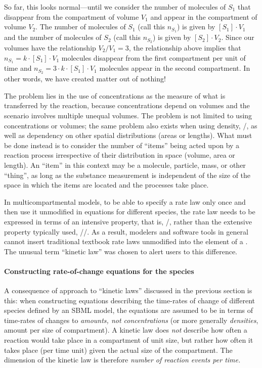 So far, this looks normal---until we consider the number of
molecules of $S_1$ that disappear from the compartment of volume
$V_1$ and appear in the compartment of volume $V_2$.  The number
of molecules of $S_1$ (call this $n_{S_1}$) is given by $[S_1]
\cdot V_1$ and the number of molecules of $S_2$ (call this
$n_{S_2}$) is given by $[S_2] \cdot V_2$.  Since our volumes have
the relationship $V_2 / V_1 = 3$, the relationship above implies
that $n_{S_1} = k \cdot [S_1] \cdot V_1$ molecules disappear from
the first compartment per unit of time and $n_{S_2} = 3
\cdot k \cdot [S_1] \cdot V_1$ molecules appear in the second
compartment.  In other words, we have created matter out of
nothing!

The problem lies in the use of concentrations as the measure of
what is transferred by the reaction, because concentrations depend
on volumes and the scenario involves multiple unequal volumes.
The problem is not limited to using concentrations or volumes; the
same problem also exists when using density, \ie
{}/, as well as dependency on other
spatial distributions (\ie areas or lengths).  What must be done
instead is to consider the number of ``items'' being acted upon by
a reaction process irrespective of their distribution in space
(volume, area or length).  An ``item'' in this context may be a
molecule, particle, mass, or other ``thing'', as long as the
substance measurement is independent of the size of the space in
which the items are located and the processes take place.

In multicompartmental models, to be able to specify a rate law only
once and then use it unmodified in equations for different
species, the rate law needs to be expressed in terms of an
intensive property, that is, /, rather than the extensive property
typically used, //.  As a result,
modelers and software tools in general cannot insert traditional
textbook rate laws unmodified into the  element of a
\KineticLaw.  The unusual term ``kinetic law'' was chosen to alert
users to this difference.


\paragraph{Constructing rate-of-change equations for the species}
\label{sec:constructing-equations}

A consequence of approach to ``kinetic laws'' discussed in the
previous section is this: when constructing equations describing
the time-rates of change of different species defined by an SBML
model, the equations are assumed to be in terms of time-rates of
changes to \emph{amounts, not concentrations} (or more
generally \emph{densities}, \ie amount per size of compartment).
A kinetic law does \emph{not} describe how often a reaction would
take place in a compartment of unit size, but rather how often it
takes place (per time unit) given the actual size of the
compartment.  The dimension of the kinetic law is therefore
\emph{number of reaction events per time.}

